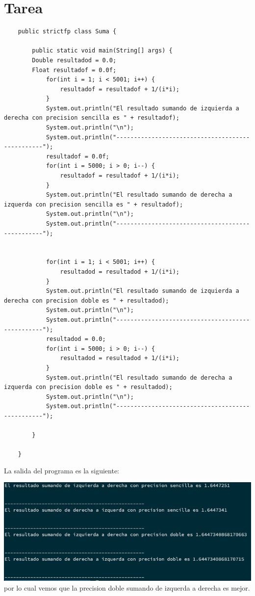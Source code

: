 \documentclass{article}
\begin{document}
\section{Tarea}

\begin{lstlisting}
    public strictfp class Suma {

        public static void main(String[] args) {
        Double resultadod = 0.0;
        Float resultadof = 0.0f;       
            for(int i = 1; i < 5001; i++) {
                resultadof = resultadof + 1/(i*i); 
            }
            System.out.println("El resultado sumando de izquierda a derecha con precision sencilla es " + resultadof);
            System.out.println("\n");
            System.out.println("-------------------------------------------------");
            resultadof = 0.0f;
            for(int i = 5000; i > 0; i--) {
                resultadof = resultadof + 1/(i*i);
            }
            System.out.println("El resultado sumando de derecha a izquerda con precision sencilla es " + resultadof);
            System.out.println("\n");
            System.out.println("-------------------------------------------------");
    
    
            for(int i = 1; i < 5001; i++) {
                resultadod = resultadod + 1/(i*i);
            }
            System.out.println("El resultado sumando de izquierda a derecha con precision doble es " + resultadod);
            System.out.println("\n");
            System.out.println("-------------------------------------------------");
            resultadod = 0.0;
            for(int i = 5000; i > 0; i--) {
                resultadod = resultadod + 1/(i*i);
            }
            System.out.println("El resultado sumando de derecha a izquerda con precision doble es " + resultadod);
            System.out.println("\n");
            System.out.println("-------------------------------------------------");
    
        }    
            
    }
\end{lstlisting}
La salida del programa es la siguiente: 

\includegraphics[scale=0.5]{SalidaJava.png}
por lo cual vemos que la precision doble sumando de izquerda a derecha es mejor.
\end{document}
